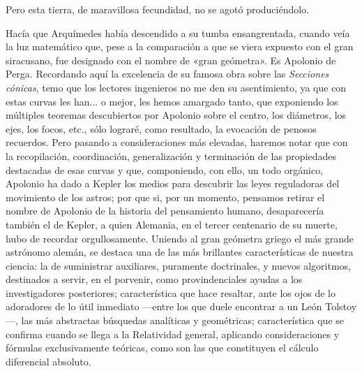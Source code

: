 \documentclass[a4paper, 12pt, draft]{article}
\begin{document}
{Pero esta tierra, de maravillosa fecundidad, no se agotó produciéndolo.

Hacía	que Arquímedes había descendido  a su tumba ensangrentada, cuando veía la luz
matemático que, pese a la comparación a que se viera expuesto con el gran siracusano, fue designado con el  nombre de «gran geómetra». Es Apolonio de Perga. Recordando  aquí la excelencia de su famosa obra sobre las \textit{ Secciones cónicas}, temo que los lectores ingenieros no me den su asentimiento,
ya que con estas curvas les han... o mejor, les hemos amargado tanto, que exponiendo los múltiples teoremas descubiertos por Apolonio sobre el centro, los diámetros, los ejes, los focos, etc., sólo lograré, como resultado, la evocación de penosos recuerdos. Pero pasando a consideraciones más elevadas, haremos notar que con la recopilación, coordinación, generalización y terminación de las propiedades destacadas de esas curvas y que, componiendo, con ello, un todo orgánico, Apolonio ha dado a Kepler los medios para descubrir las leyes reguladoras del movimiento de los astros; por que si, por un momento, pensamos retirar el nombre de Apolonio de la historia del pensamiento humano, desaparecería también el de Kepler, a quien Alemania, en el tercer centenario de su muerte, hubo de recordar orgullosamente. Uniendo al gran geómetra griego el más grande astrónomo alemán, se destaca una de las más brillantes características de nuestra ciencia: la de suministrar auxiliares, puramente doctrinales, y nuevos algoritmos, destinados a servir, en el porvenir, como provindenciales ayudas a los investigadores posteriores; característica que hace resaltar, ante los ojos de lo adoradores de lo útil inmediato ---entre los que duele encontrar a un León Tolstoy---, las más abstractas búsquedas analíticas y geométricas; característica que se confirma cuando se llega a la Relatividad general, aplicando consideraciones y fórmulas exclusivamente teóricas, como son las que constituyen el cálculo diferencial absoluto.



}
\end{document}
